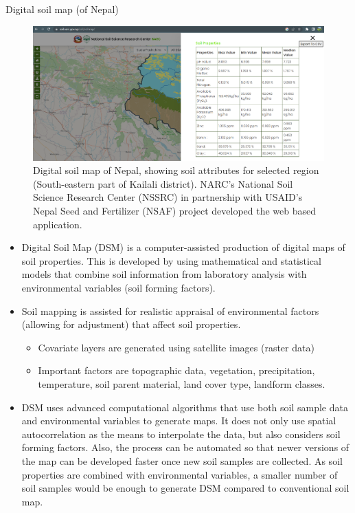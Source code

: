 \documentclass[11pt,dvipsnames,ignorenonframetext,aspectratio=169]{beamer}
\providecommand{\tightlist}{%
  \setlength{\itemsep}{0pt}\setlength{\parskip}{0pt}}
\begin{document}
\begin{frame}{Digital soil map (of Nepal)}
\protect\hypertarget{digital-soil-map-of-nepal}{}
\begin{figure}
\includegraphics[width=0.8\linewidth]{../images/digital_soil_map_nepal_narc} \caption{Digital soil map of Nepal, showing soil attributes for selected region (South-eastern part of Kailali district). NARC's National Soil Science Research Center (NSSRC) in partnership with USAID's Nepal Seed and Fertilizer (NSAF) project developed the web based application.}\label{fig:digital-soil-map-nepal}
\end{figure}
\end{frame}

\begin{frame}{}
\protect\hypertarget{section-8}{}
\small

\begin{itemize}
\tightlist
\item
  Digital Soil Map (DSM) is a computer-assisted production of digital
  maps of soil properties. This is developed by using mathematical and
  statistical models that combine soil information from laboratory
  analysis with environmental variables (soil forming factors).
\item
  Soil mapping is assisted for realistic appraisal of environmental
  factors (allowing for adjustment) that affect soil properties.

  \begin{itemize}
  \tightlist
  \item
    Covariate layers are generated using satellite images (raster data)
  \item
    Important factors are topographic data, vegetation, precipitation,
    temperature, soil parent material, land cover type, landform
    classes.
  \end{itemize}
\item
  DSM uses advanced computational algorithms that use both soil sample
  data and environmental variables to generate maps. It does not only
  use spatial autocorrelation as the means to interpolate the data, but
  also considers soil forming factors. Also, the process can be
  automated so that newer versions of the map can be developed faster
  once new soil samples are collected. As soil properties are combined
  with environmental variables, a smaller number of soil samples would
  be enough to generate DSM compared to conventional soil map.
\end{itemize}
\end{frame}
\end{document}
